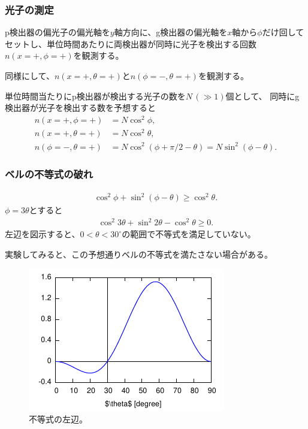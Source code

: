 \documentclass[10pt,b5paper,papersize,dvipdfmx]{jsbook}
\begin{document}
%
\subsubsection{光子の測定}
p検出器の偏光子の偏光軸を$y$軸方向に、g検出器の偏光軸を$x$軸から$\phi$だけ回してセットし、単位時間あたりに両検出器が同時に光子を検出する回数$n(x=+,\phi=+)$を観測する。\par
同様にして、$n(x=+,\theta=+)$と$n(\phi=-,\theta=+)$を観測する。

単位時間当たりにp検出器が検出する光子の数を$N \,(\gg 1)$個として、
同時にg検出器が光子を検出する数を予想すると
\begin{align*}
  n(x=+,\phi=+) &= N \cos^2\phi, \\
  n(x=+,\theta=+) &= N \cos^2\theta, \\
  n(\phi=-,\theta=+) &= N \cos^2(\phi + \pi/2 - \theta) = N \sin^2(\phi - \theta).
\end{align*}

%
\subsubsection{ベルの不等式の破れ}

\begin{align*}
  \cos^2\phi + \sin^2(\phi - \theta) \ge \cos^2\theta.
\end{align*}
$\phi = 3\theta$とすると
\begin{align*}
  \cos^2 3\theta + \sin^2 2\theta - \cos^2\theta \ge 0.
\end{align*}
左辺を図示すると、$0 < \theta < 30^\circ$の範囲で不等式を満足していない。

実験してみると、この予想通りベルの不等式を満たさない場合がある。

\begin{figure}[htp]
  \centering
  \includegraphics{nkym/fig/Aspect.pdf}
  \caption{不等式の左辺。}
\end{figure}
\end{document}
